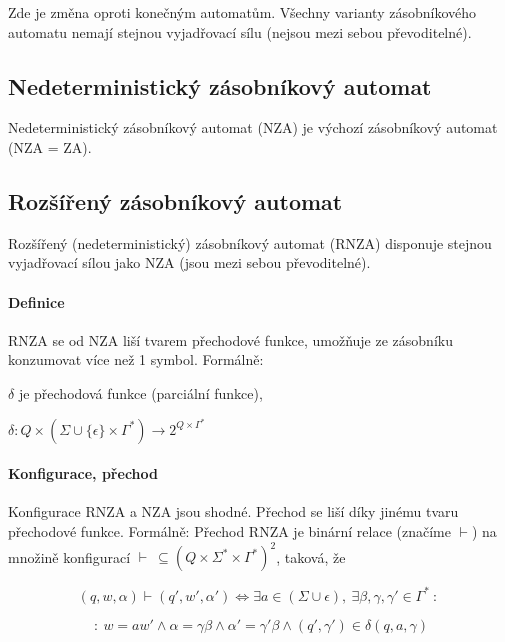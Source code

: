 Zde je změna oproti konečným automatům. Všechny varianty zásobníkového automatu nemají stejnou vyjadřovací sílu (nejsou mezi sebou převoditelné).

\subsection{Nedeterministický zásobníkový automat} Nedeterministický zásobníkový automat (NZA) je výchozí zásobníkový automat (NZA = ZA).

\subsection{Rozšířený zásobníkový automat}

Rozšířený (nedeterministický) zásobníkový automat (RNZA) disponuje stejnou vyjadřovací sílou jako NZA (jsou mezi sebou převoditelné).

\paragraph*{Definice} RNZA se od NZA liší tvarem přechodové funkce, umožňuje ze zásobníku konzumovat více než 1 symbol. Formálně:

\begin{compactitem}
    \item $\delta$ je přechodová funkce (parciální funkce), \begin{compactitem}
        \item $\delta : Q \times (\Sigma \cup \{ \epsilon \} \times \Gamma^*) \rightarrow 2^{Q \times \Gamma^*}$
    \end{compactitem}
\end{compactitem}

\paragraph*{Konfigurace, přechod} Konfigurace RNZA a NZA jsou shodné. Přechod se liší díky jinému tvaru přechodové funkce. Formálně: Přechod RNZA je binární relace (značíme $\vdash$) na množině konfigurací $\vdash ~ \subseteq (Q \times \Sigma^* \times \Gamma^*)^2$, taková, že

$$ (q, w, \alpha) \vdash (q', w', \alpha') \Leftrightarrow \exists a \in (\Sigma \cup \epsilon), ~ \exists \beta, \gamma, \gamma' \in \Gamma^* ~:~ $$

$$ ~:~ w = aw' \land \alpha = \gamma \beta \land \alpha' = \gamma' \beta \land (q', \gamma') \in \delta(q, a, \gamma) $$

